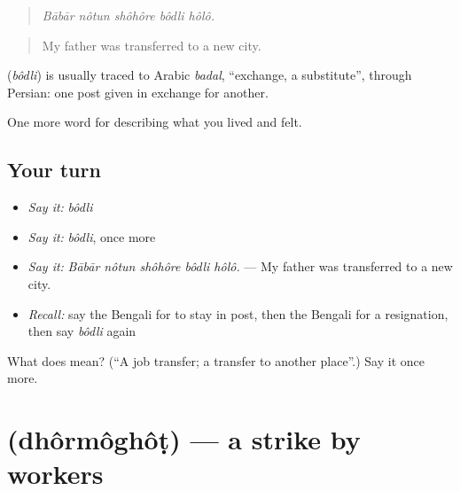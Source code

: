 \begin{quote}
    
\end{quote}

\begin{quote}
\emph{Bābār nôtun shôhôre bôdli hôlô.}
\end{quote}

\begin{quote}
My father was transferred to a new city.
\end{quote}

\begin{cousinweb}
\textbf{} (\emph{bôdli}) is usually traced to Arabic \emph{badal}, \textquotedblleft{}exchange, a substitute\textquotedblright{}, through Persian: one post given in exchange for another.
\end{cousinweb}

\begin{grammarlens}[title={What you've built}]
One more word for describing what you lived and felt.
\end{grammarlens}

\subsection*{Your turn}
\begin{itemize}
\raggedright
  \item \emph{Say it:} \emph{bôdli}
  \item \emph{Say it:} \emph{bôdli}, once more
  \item \emph{Say it:} \emph{Bābār nôtun shôhôre bôdli hôlô.} — My father was transferred to a new city.
  \item \emph{Recall:} say the Bengali for to stay in post, then the Bengali for a resignation, then say \emph{bôdli} again
\end{itemize}

\begin{tcolorbox}[breakable,colback=teal!4,colframe=teal!35!black,title={Before you move on}]
What does  mean? (\textquotedblleft{}A job transfer; a transfer to another place\textquotedblright{}.) Say it once more.
\end{tcolorbox}
\section[\texorpdfstring{\bn{ধর্মঘট} (dhôrmôghôṭ)}{ধর্মঘট (dhôrmôghôṭ)}]{ (dhôrmôghôṭ) — a strike by workers}

